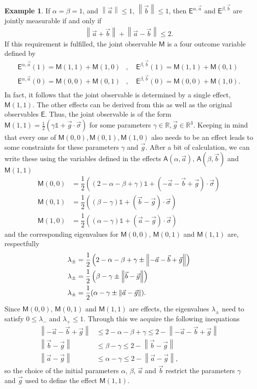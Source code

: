 \documentclass[a4paper,12pt]{wihuri}
\theoremstyle{definition}
\newtheorem{example}{Example}
\numberwithin{definition}{section}
\numberwithin{example}{section}
\numberwithin{theorem}{section}
\numberwithin{proposition}{section}
\numberwithin{lemma}{section}
\newcommand{\A}{\mathsf{A}}%
\newcommand{\M}{\mathsf{M}}%
\newcommand{\E}{\mathsf{E}}%
\newcommand{\id}{\mathds{1}}
\newcommand{\real}{\mathbb{R}}%
\newcommand{\norm}[1]{\left\lVert#1\right\rVert}
\begin{document}
\begin{example}
If $\alpha = \beta = 1$, and $\norm{\vec{a}}\leq 1,\, \norm{\vec{b}}\leq 1$, then $\E^{\alpha, \vec{a}}$ and $\E^{\beta, \vec{b}}$ are jointly measurable if and only if 
\begin{align*}
\norm{\vec{a}+\vec{b}} + \norm{\vec{a} - \vec{b}} \leq 2\text{.}
\end{align*}
If this requirement is fulfilled, the joint observable $\M$ is a four outcome variable defined by 
\begin{align*}
\E^{\alpha, \vec{a}}(1) = \M(1,1) + \M(1,0) &,\quad \E^{\beta, \vec{b}}(1) = \M(1,1) + \M(0,1) \\
\E^{\alpha, \vec{a}}(0) = \M(0,0) + \M(0,1) &,\quad \E^{\beta, \vec{b}}(0) = \M(0,0) + \M(1,0)\text{.} \\
\end{align*}
In fact, it follows that the joint observable is determined by a single effect, $\M(1,1)$. The other effects can be derived from this as well as the original observables $\E$. Thus, the joint observable is of the form $\M(1,1) = \frac{1}{2}(\gamma\id + \vec{g}\cdot\vec{\sigma})$ for some parameters $\gamma \in \real, \vec{g} \in \real^3$. Keeping in mind that every one of $\M(0,0), \M(0,1), \M(1,0)$ also needs to be an effect leads to some constraints for these parameters $\gamma$ and $\vec{g}$. After a bit of calculation, we can write these using the variables defined in the effects $\A(\alpha,\vec{a}),\,\A(\beta,\vec{b})$ and $\M(1,1)$
\begin{align*}
\M(0,0) &= \dfrac{1}{2}\left((2-\alpha-\beta+\gamma)\id + (-\vec{a}-\vec{b}+\vec{g})\cdot\vec{\sigma} \right)\\
\M(0,1) &= \dfrac{1}{2}\left((\beta-\gamma)\id + (\vec{b}-\vec{g})\cdot\vec{\sigma} \right)\\
\M(1,0) &= \dfrac{1}{2}\left( (\alpha-\gamma)\id + (\vec{a}-\vec{g})\cdot\vec{\sigma} \right)
\end{align*}
and the corresponding eigenvalues for $\M(0,0),\,\M(0,1)$ and $\M(1,1)$ are, respectfully
\begin{align*}
\lambda_{\pm} &= \dfrac{1}{2}\left(2-\alpha-\beta+\gamma \pm \norm{-\vec{a}-\vec{b}+\vec{g}}\right)\\
\lambda_{\pm} &= \dfrac{1}{2}\left(\beta-\gamma \pm \norm{\vec{b}-\vec{g}}\right)\\
\lambda_{\pm} &= \dfrac{1}{2}(\alpha-\gamma \pm \norm{\vec{a}-\vec{g}})\text.
\end{align*}
Since $\M(0,0),\,\M(0,1)$ and $\M(1,1)$ are effects, the eigenvalues $\lambda_{\pm}$ need to satisfy $0 \leq \lambda_{-}$ and $\lambda_{+} \leq 1$. Through this we acquire the following inequations
\begin{align*}
\norm{-\vec{a}-\vec{b}+\vec{g}} &\leq 2-\alpha-\beta+\gamma \leq 2-\norm{-\vec{a}-\vec{b}+\vec{g}}\\
\norm{\vec{b}-\vec{g}} &\leq \beta-\gamma \leq 2-\norm{\vec{b}-\vec{g}}\\
\norm{\vec{a}-\vec{g}} &\leq \alpha-\gamma \leq 2-\norm{\vec{a}-\vec{g}},
\end{align*}
so the choice of the initial parameters $\alpha,\,\beta,\,\vec{a}$ and $\vec{b}$ restrict the parameters $\gamma$ and $\vec{g}$ used to define the effect $\M(1,1)$.


\end{example}
\end{document}
